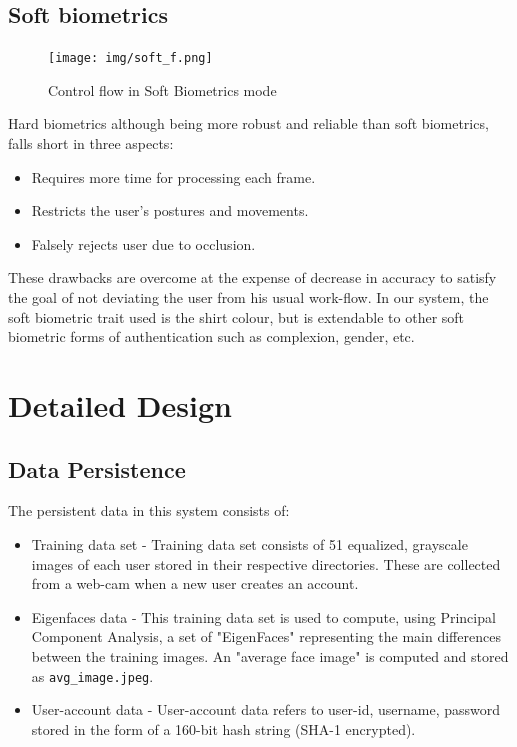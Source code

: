 \documentclass[12pt]{report}			%
\begin{document}
\section{Soft biometrics}
\begin{figure}[h!]
	\centering
	\texttt{[image: img/soft\_f.png]}
	\caption{Control flow in Soft Biometrics mode}
	\label{fig:cfsb}
\end{figure}
Hard biometrics although being more robust and reliable than soft biometrics, falls short in three aspects\cite{Niin10}:
\begin{itemize}
	\item Requires more time for processing each frame.
	\item Restricts the user's postures and movements.
	\item Falsely rejects user due to occlusion.
\end{itemize}
These drawbacks are overcome at the expense of decrease in accuracy to satisfy the goal of not deviating the user from his usual work-flow. 
In our system, the soft biometric trait used is the shirt colour, but is extendable to other soft biometric forms of authentication such as complexion, gender\cite{Jain204}, etc. 


\chapter{ Detailed Design }
\section{ Data Persistence }
The persistent data in this system consists of:
\begin{itemize}
\item Training data set - Training data set consists of 51 equalized, grayscale images of each user stored in their respective directories. These are collected from a web-cam when a new user creates an account.%
\item Eigenfaces data - This training data set is used to compute, using Principal Component Analysis, a set of "EigenFaces" representing the main differences between the training images. An "average face image" is computed and stored as \verb+avg_image.jpeg+. 
\item User-account data - User-account data refers to user-id, username, password stored in the form of a 160-bit hash string (SHA-1 encrypted).
\end{itemize}
\end{document}
